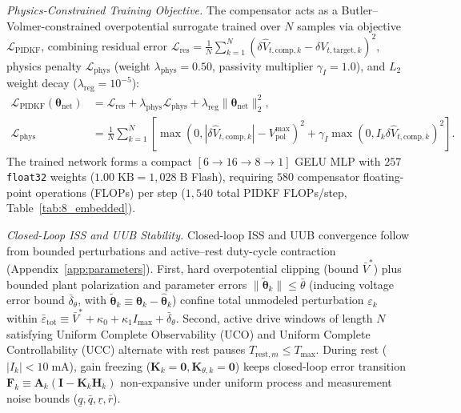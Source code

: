 \documentclass[10pt,a4paper]{article}
\begin{document}
\emph{Physics-Constrained Training Objective.} The compensator acts as a Butler--Volmer-constrained overpotential surrogate trained over $N$ samples via objective $\mathcal{L}_{\text{PIDKF}}$, combining residual error $\mathcal{L}_{\text{res}} = \frac{1}{N}\sum_{k=1}^N (\delta\hat{V}_{t,\text{comp},k} - \delta V_{t,\text{target},k})^2$, physics penalty $\mathcal{L}_{\text{phys}}$ (weight $\lambda_{\text{phys}} = 0.50$, passivity multiplier $\gamma_I = 1.0$), and $L_2$ weight decay ($\lambda_{\text{reg}} = 10^{-5}$):
\begin{align}
\mathcal{L}_{\text{PIDKF}}(\boldsymbol{\theta}_{\text{net}}) &= \mathcal{L}_{\text{res}} + \lambda_{\text{phys}} \mathcal{L}_{\text{phys}} + \lambda_{\text{reg}} \|\boldsymbol{\theta}_{\text{net}}\|_2^2, \label{eqn:loss_pidkf}\\
\mathcal{L}_{\text{phys}} &= \frac{1}{N}\sum_{k=1}^N \left[\max\left(0, |\delta \hat{V}_{t,\text{comp},k}| - V_{\text{pol}}^{\max}\right)^2 + \gamma_I \max\left(0, I_k \delta \hat{V}_{t,\text{comp},k}\right)^2\right]. \label{eqn:loss_pidkf_phys}
\end{align}
The trained network forms a compact $[6 \rightarrow 16 \rightarrow 8 \rightarrow 1]$ GELU MLP with $257$ \texttt{float32} weights ($1.00\;\mathrm{KB} = 1,028\;\mathrm{B}$ Flash), requiring $580$ compensator floating-point operations (FLOPs) per step ($1,540$ total PIDKF FLOPs/step, Table~\ref{tab:8_embedded}).

\emph{Closed-Loop ISS and UUB Stability.} Closed-loop ISS and UUB convergence follow from bounded perturbations and active--rest duty-cycle contraction (Appendix~\ref{app:parameters}). First, hard overpotential clipping (bound $\bar{V}^*$) plus bounded plant polarization and parameter errors $\|\tilde{\boldsymbol{\theta}}_k\| \le \bar{\theta}$ (inducing voltage error bound $\bar{\delta}_\theta$, with $\tilde{\boldsymbol{\theta}}_k \equiv \boldsymbol{\theta}_k - \hat{\boldsymbol{\theta}}_k$) confine total unmodeled perturbation $\varepsilon_k$ within $\bar{\varepsilon}_{\text{tot}} \equiv \bar{V}^* + \kappa_0 + \kappa_1 I_{\max} + \bar{\delta}_\theta$. Second, active drive windows of length $N$ satisfying Uniform Complete Observability (UCO) and Uniform Complete Controllability (UCC) alternate with rest pauses $T_{\text{rest},m} \le T_{\max}$. During rest ($|I_k| < 10\;\mathrm{mA}$), gain freezing ($\mathbf{K}_k = \mathbf{0}, \mathbf{K}_{\theta,k} = \mathbf{0}$) keeps closed-loop error transition $\mathbf{F}_k \equiv \mathbf{A}_k(\mathbf{I} - \mathbf{K}_k\mathbf{H}_k)$ non-expansive under uniform process and measurement noise bounds ($\underline{q}, \bar{q}, \underline{r}, \bar{r}$).
\end{document}
